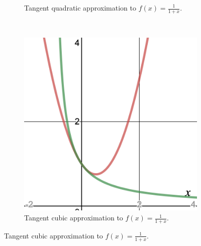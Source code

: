 \begin{figure}[H]
\begin{subfigure}[h]{.3\textwidth}
        \caption{Tangent quadratic approximation to $f(x)=\frac{1}{1+x}$.}
    \end{subfigure}
    ~
    \begin{subfigure}[h]{.3\textwidth}
        \includegraphics[width=\textwidth]{Figures_Part_3/tangent_quad_approx.png}
        \caption{Tangent cubic approximation to $f(x)=\frac{1}{1+x}$.}
    \end{subfigure}
\end{figure}

